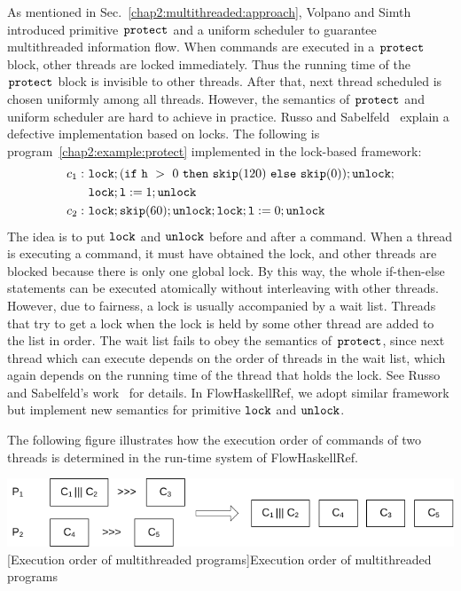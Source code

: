 \documentclass{report}
\newcommand{\co}[1]{$\cod{#1}$}
\begin{document}
As mentioned in Sec.~\ref{chap2:multithreaded:approach}, Volpano and Simth~\cite{Volpano:Smith:Probabilistic}
introduced primitive \co{protect} and a uniform scheduler to guarantee multithreaded information flow. 
When commands are executed in a \co{protect} block, other threads are locked
immediately. Thus the running time of the \co{protect} block is invisible to other threads. After that, next thread
scheduled is chosen uniformly among all threads.
However, the semantics of \co{protect} and uniform scheduler are hard to achieve in practice. 
Russo and Sabelfeld~\cite{Russo:Sabelfeld:CSFW06}
explain a defective implementation based on locks. 
The following is program~\ref{chap2:example:protect} implemented in the lock-based framework:
\begin{align*}
c_1:&~\mathtt{lock};(\mathtt{if}~\mathtt{h}~>~0~\mathtt{then}~\mathtt{skip}(120)~\mathtt{else}~\mathtt{skip}(0));\mathtt{unlock}; \\
    &~\mathtt{lock};\mathtt{l}:=1;\mathtt{unlock} \\
c_2:&~\mathtt{lock};\mathtt{skip}(60);\mathtt{unlock};\mathtt{lock};\mathtt{l}:=0;\mathtt{unlock}
\end{align*}
The idea is to put \co{lock} and \co{unlock} before and after a command. When a thread is executing a command,
it must have obtained the lock, and other threads are blocked because there is only one global lock. By this way, the
whole if-then-else statements can be executed atomically without interleaving with other threads.
However, due to fairness, a lock is usually accompanied by a wait
list. Threads that try to get a lock when the lock is held by some other thread are added to the list in order. 
The wait list fails to obey the semantics of \co{protect}, since next thread which can execute depends on the order
of threads in the wait list, which again depends on the running time of the thread that holds the lock. 
See Russo and Sabelfeld's work~\cite{Russo:Sabelfeld:CSFW06} for details.
In FlowHaskellRef, we adopt similar framework but implement new semantics for primitive \co{lock} and \co{unlock}.

The following figure illustrates how the execution order of commands of two threads is determined in the 
run-time system of FlowHaskellRef.

\begin{center}
\includegraphics[scale=0.9]{multi.pdf} \\
[Execution order of multithreaded programs]{Execution order of multithreaded programs}
\end{center}
\end{document}
